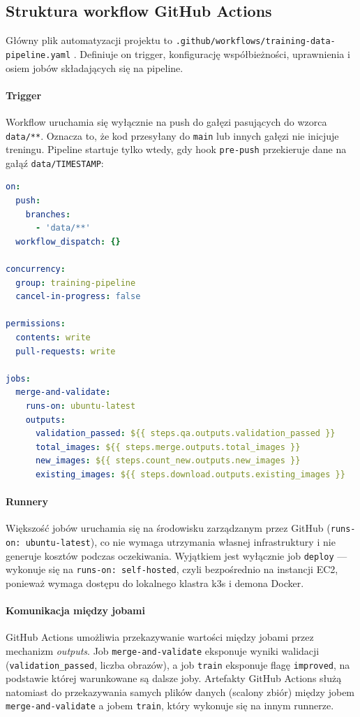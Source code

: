\subsection{Struktura workflow GitHub Actions}

Główny plik automatyzacji projektu to \texttt{.github/workflows/training-data-pipeline.yaml} \cite{github_actions_docs}. Definiuje on trigger, konfigurację współbieżności, uprawnienia i osiem jobów składających się na pipeline.

\paragraph{Trigger}\mbox{}
Workflow uruchamia się wyłącznie na push do gałęzi pasujących do wzorca \texttt{data/**}. Oznacza to, że kod przesyłany do \texttt{main} lub innych gałęzi nie inicjuje treningu. Pipeline startuje tylko wtedy, gdy hook \texttt{pre-push} przekieruje dane na gałąź \texttt{data/TIMESTAMP}:

\begin{lstlisting}[language=yaml]
on:
  push:
    branches:
      - 'data/**'
  workflow_dispatch: {}

concurrency:
  group: training-pipeline
  cancel-in-progress: false

permissions:
  contents: write
  pull-requests: write
  
jobs:
  merge-and-validate:
    runs-on: ubuntu-latest
    outputs:
      validation_passed: ${{ steps.qa.outputs.validation_passed }}
      total_images: ${{ steps.merge.outputs.total_images }}
      new_images: ${{ steps.count_new.outputs.new_images }}
      existing_images: ${{ steps.download.outputs.existing_images }}
\end{lstlisting}

\paragraph{Runnery}\mbox{}
\begin{sloppypar}
Większość jobów uruchamia się na środowisku zarządzanym przez GitHub  (\texttt{runs-on: ubuntu-latest}), co nie wymaga utrzymania własnej infrastruktury i nie generuje kosztów podczas oczekiwania. Wyjątkiem jest wyłącznie job \texttt{deploy} --- wykonuje się na \texttt{runs-on: self-hosted}, czyli bezpośrednio na instancji EC2, ponieważ wymaga dostępu do lokalnego klastra k3s i demona Docker.
\end{sloppypar}

\paragraph{Komunikacja między jobami}\mbox{}
GitHub Actions umożliwia przekazywanie wartości między jobami przez mechanizm \textit{outputs}. Job \texttt{merge-and-validate} eksponuje wyniki walidacji (\texttt{validation\_passed}, liczba obrazów), a job \texttt{train} eksponuje flagę \texttt{improved}, na podstawie której warunkowane są dalsze joby. Artefakty GitHub Actions służą natomiast do przekazywania samych plików danych (scalony zbiór) między jobem \texttt{merge-and-validate} a jobem \texttt{train}, który wykonuje się na innym runnerze.

